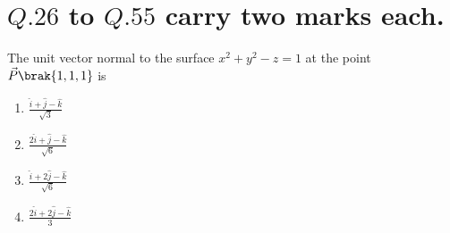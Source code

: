 \section{$Q.26$ to $Q.55$ carry two marks each.}
\item The unit vector normal to the surface $x^2+y^2-z=1$ at the point $\vec{P}\brak{1,1,1}$ is 
\begin{enumerate}
    \item $\frac{\hat{i}+\hat{j}-\hat{k}}{\sqrt{3}}$
    \item $\frac{2\hat{i}+\hat{j}-\hat{k}}{\sqrt{6}}$
    \item $\frac{\hat{i}+2\hat{j}-\hat{k}}{\sqrt{6}}$
    \item $\frac{2\hat{i}+2\hat{j}-\hat{k}}{3}$
\end{enumerate}
 



